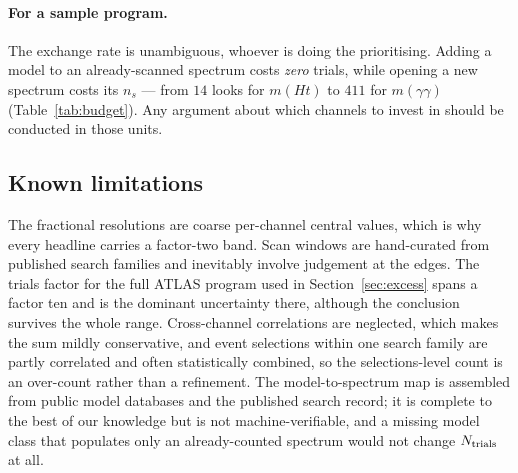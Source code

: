 \paragraph{For a sample program.} The exchange rate is unambiguous, whoever is doing the
prioritising. Adding a model to an already-scanned spectrum costs \emph{zero} trials, while opening
a new spectrum costs its $n_s$ --- from $14$ looks for $m(Ht)$ to $411$ for $m(\gamma\gamma)$
(Table~\ref{tab:budget}). Any argument about which channels to invest in should be conducted in
those units.

\subsection{Known limitations}

The fractional resolutions are coarse per-channel central values, which is why every headline
carries a factor-two band. Scan windows are hand-curated from published search families and
inevitably involve judgement at the edges. The trials factor for the full ATLAS program used in
Section~\ref{sec:excess} spans a factor ten and is the dominant uncertainty there, although the
conclusion survives the whole range. Cross-channel correlations are neglected, which makes the sum
mildly conservative, and event selections within one search family are partly correlated and often
statistically combined, so the selections-level count is an over-count rather than a refinement.
The model-to-spectrum map is assembled from public model databases and the published search record;
it is complete to the best of our knowledge but is not machine-verifiable, and a missing model class
that populates only an already-counted spectrum would not change $N_{\mathrm{trials}}$ at all.
